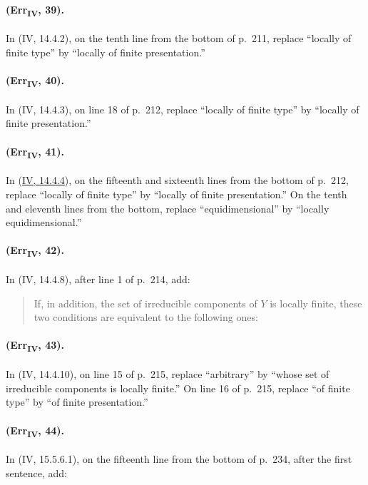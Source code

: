 {\paragraph{(Err\textsubscript{IV}, 39).}
In (IV, 14.4.2), on the tenth line from the bottom of p.~211, replace
``locally of finite type'' by ``locally of finite presentation.''

\paragraph{(Err\textsubscript{IV}, 40).}
In (IV, 14.4.3), on line 18 of p.~212, replace ``locally of finite type''
by ``locally of finite presentation.''

\paragraph{(Err\textsubscript{IV}, 41).}
In ({\hyperref[IV.14.4.4]{IV, 14.4.4}}), on the fifteenth and sixteenth lines from the bottom of
p.~212, replace ``locally of finite type'' by ``locally of finite
presentation.''  On the tenth and eleventh lines from the bottom,
replace ``equidimensional'' by ``locally equidimensional.''

\paragraph{(Err\textsubscript{IV}, 42).}
In (IV, 14.4.8), after line 1 of p.~214, add:
\begin{quote}
If, in addition, the set of irreducible components of $Y$ is locally
finite, these two conditions are equivalent to the following ones:
\end{quote}

\paragraph{(Err\textsubscript{IV}, 43).}
In (IV, 14.4.10), on line 15 of p.~215, replace ``arbitrary'' by ``whose
set of irreducible components is locally finite.''  On line 16 of
p.~215, replace ``of finite type'' by ``of finite presentation.''

\paragraph{(Err\textsubscript{IV}, 44).}
In (IV, 15.5.6.1), on the fifteenth line from the bottom of p.~234,
after the first sentence, add:

}
